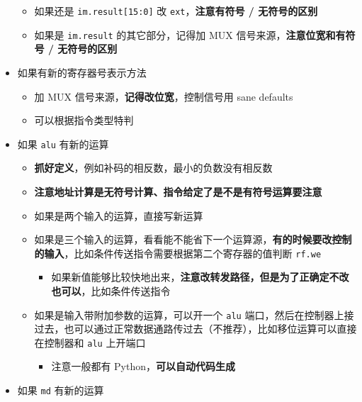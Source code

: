 \documentclass[12pt,AutoFakeBold,AutoFakeSlant]{article}
\providecommand{\tightlist}{%
  \setlength{\itemsep}{0pt}\setlength{\parskip}{0pt}}
\begin{document}
\begin{itemize}
  \begin{itemize}
  \tightlist
  \item
    如果还是 \texttt{im.result{[}15:0{]}} 改
    \texttt{ext}，\textbf{注意有符号 / 无符号的区别}
  \item
    如果是 \texttt{im.result} 的其它部分，记得加 MUX
    信号来源，\textbf{注意位宽和有符号 / 无符号的区别}
  \end{itemize}
\item
  如果有新的寄存器号表示方法

  \begin{itemize}
  \tightlist
  \item
    加 MUX 信号来源，\textbf{记得改位宽}，控制信号用 sane defaults
  \item
    可以根据指令类型特判
  \end{itemize}
\item
  如果 \texttt{alu} 有新的运算

  \begin{itemize}
  \tightlist
  \item
    \textbf{抓好定义}，例如补码的相反数，最小的负数没有相反数
  \item
    \textbf{注意地址计算是无符号计算、指令给定了是不是有符号运算要注意}
  \item
    如果是两个输入的运算，直接写新运算
  \item
    如果是三个输入的运算，看看能不能省下一个运算源，\textbf{有的时候要改控制的输入}，比如条件传送指令需要根据第二个寄存器的值判断
    \texttt{rf.we}

    \begin{itemize}
    \tightlist
    \item
      如果新值能够比较快地出来，\textbf{注意改转发路径，但是为了正确定不改也可以}，比如条件传送指令
    \end{itemize}
  \item
    如果是输入带附加参数的运算，可以开一个 \texttt{alu}
    端口，然后在控制器上接过去，也可以通过正常数据通路传过去（不推荐），比如移位运算可以直接在控制器和
    \texttt{alu} 上开端口

    \begin{itemize}
    \tightlist
    \item
      注意一般都有 Python，\textbf{可以自动代码生成}
    \end{itemize}
  \end{itemize}
\item
  如果 \texttt{md} 有新的运算


\end{itemize}
\end{document}
